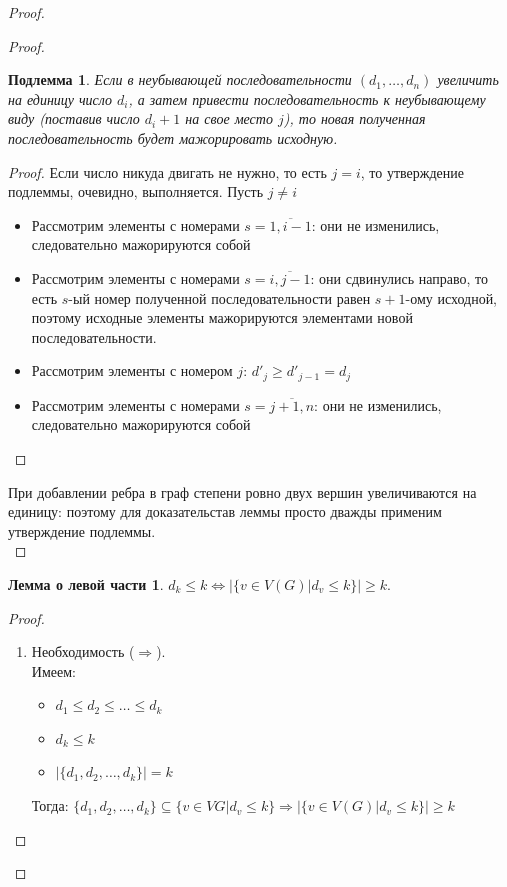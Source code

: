 \documentclass[10pt,a4paper]{article}
\begin{document}
\begin{enumerate}
\begin{proof}
\begin{proof}
	\newtheorem*{lemma1_1}{Подлемма}
	\begin{lemma1_1}
	Если в неубывающей последовательности $(d_1,\ldots,d_n)$ увеличить на единицу число $d_i$, а затем привести последовательность к неубывающему виду (поставив число $d_i+1$ на свое место $j$), то новая полученная последовательность будет мажорировать исходную.
	\end{lemma1_1}
	\begin{proof}
	Если число никуда двигать не нужно, то есть $j=i$, то утверждение подлеммы, очевидно, выполняется. Пусть $j \neq i$
	\begin{itemize}
	\item Рассмотрим элементы с номерами $s = \overline{1, i - 1}$: они не изменились, следовательно мажорируются собой
	\item Рассмотрим элементы с номерами $s = \overline{i, j - 1}$: они сдвинулись направо, то есть $s$-ый номер полученной последовательности равен $s+1$-ому исходной, поэтому исходные элементы мажорируются элементами новой последовательности.
	\item Рассмотрим элементы с номером $j$: $d'_j \geqslant d'_{j-1}=d_j$
	\item Рассмотрим элементы с номерами $s = \overline{j+1, n}$: они не изменились, следовательно мажорируются собой
	\end{itemize} \qedhere
	\end{proof}	
	При добавлении ребра в граф степени ровно двух вершин увеличиваются на единицу: поэтому для доказательстав леммы просто дважды применим утверждение подлеммы. \\\qedhere
	\end{proof}
	
	\newtheorem*{lemma2}{Лемма о левой части}
	\begin{lemma2}
	$d_k \leq k \Leftrightarrow |\{ v \in V(G) | d_v \leq k \}| \geq k.$
	\end{lemma2}
	\begin{proof} 	
	\begin{enumerate}
	\item
	Необходимость ($\Rightarrow$).\\
	Имеем:
	\begin{itemize}
	\item $d_1 \leq d_2 \leq \ldots \leq d_k$
	\item $d_k \leq k$
	\item $|\{ d_1, d_2, \ldots, d_k \}| = k$
	\end{itemize}
	Тогда: $\{ d_1, d_2, \ldots, d_k \} \subseteq \{ v \in VG | d_v \leq k \} \Rightarrow |\{ v \in V(G) | d_v \leq k \}| \geq k$
	

\end{enumerate}
\end{proof}
\end{proof}
\end{enumerate}
\end{document}
